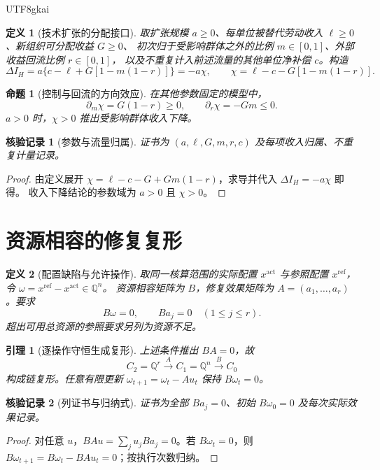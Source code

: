 \documentclass[12pt,a4paper,openany]{report}
\newtheorem{definition}{定义}[chapter]
\newtheorem{lemma}{引理}[chapter]
\newtheorem{proposition}{命题}[chapter]
\newtheorem{Certificate}{核验记录}[chapter]
\numberwithin{equation}{chapter}
\newcommand{\QQ}{\mathbb Q}
\begin{document}
\begin{CJK*}{UTF8}{gkai}
\begin{definition}[技术扩张的分配接口]
取扩张规模 $a\ge0$、每单位被替代劳动收入 $\ell\ge0$、新组织可分配收益 $G\ge0$、
初次归于受影响群体之外的比例 $m\in[0,1]$、外部收益回流比例 $r\in[0,1]$，
以及不重复计入前述流量的其他单位净补偿 $c$。构造
\[
 \Delta I_H=a\{c-\ell+G[1-m(1-r)]\}=-a\chi,
 \qquad \chi=\ell-c-G[1-m(1-r)].
\]
\end{definition}

\begin{proposition}[控制与回流的方向效应]
在其他参数固定的模型中，
\[
 \partial_m\chi=G(1-r)\ge0,\qquad
 \partial_r\chi=-Gm\le0.
\]
$a>0$ 时，$\chi>0$ 推出受影响群体收入下降。
\end{proposition}
\begin{Certificate}[参数与流量归属]
证书为 $(a,\ell,G,m,r,c)$ 及每项收入归属、不重复计量记录。
\end{Certificate}
\begin{proof}
由定义展开 $\chi=\ell-c-G+Gm(1-r)$，求导并代入 $\Delta I_H=-a\chi$ 即得。
收入下降结论的参数域为 $a>0$ 且 $\chi>0$。
\end{proof}

\section{资源相容的修复复形}

\begin{definition}[配置缺陷与允许操作]
取同一核算范围的实际配置 $x^{\mathrm{act}}$ 与参照配置 $x^{\mathrm{ref}}$，令
$\omega=x^{\mathrm{ref}}-x^{\mathrm{act}}\in\QQ^n$。
资源相容矩阵为 $B$，修复效果矩阵为 $A=(a_1,\ldots,a_r)$。要求
\[
 B\omega=0,\qquad Ba_j=0\quad(1\le j\le r).
\]
超出可用总资源的参照要求另列为资源不足。
\end{definition}

\begin{lemma}[逐操作守恒生成复形]
\label{lem:balance}
上述条件推出 $BA=0$，故
\[
 C_2=\QQ^r\xrightarrow{A}C_1=\QQ^n\xrightarrow{B}C_0
\]
构成链复形。任意有限更新 $\omega_{t+1}=\omega_t-Au_t$ 保持 $B\omega_t=0$。
\end{lemma}
\begin{Certificate}[列证书与归纳式]
证书为全部 $Ba_j=0$、初始 $B\omega_0=0$ 及每次实际效果记录。
\end{Certificate}
\begin{proof}
对任意 $u$，$BAu=\sum_j u_jBa_j=0$。若 $B\omega_t=0$，则
$B\omega_{t+1}=B\omega_t-BAu_t=0$；按执行次数归纳。
\end{proof}


\end{CJK*}
\end{document}
